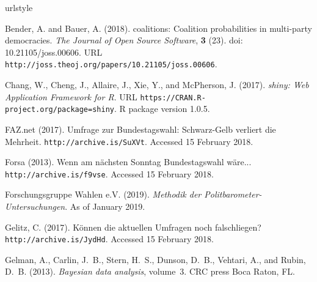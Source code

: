 \documentclass[smallextended]{svjour3}      %
\begin{document}

\begin{thebibliography}{13}
\providecommand{\natexlab}[1]{#1}
\providecommand{\url}[1]{\texttt{#1}}
\expandafter\ifx\csname urlstyle\endcsname\relax
  \providecommand{\doi}[1]{doi: #1}\else
  \providecommand{\doi}{doi: \begingroup \urlstyle{rm}\Url}\fi

{\rm Bender, A. {\rm and} Bauer, A.} (2018).
\newblock coalitions: Coalition probabilities in multi-party democracies.
\newblock \emph{The Journal of Open Source Software}, {\bf 3} (23).
\newblock \doi{10.21105/joss.00606}.
\newblock URL \url{http://joss.theoj.org/papers/10.21105/joss.00606}.

{\rm Chang, W., Cheng, J., Allaire, J., Xie, Y., {\rm and} McPherson, J.}
  (2017).
\newblock \emph{shiny: Web Application Framework for R}.
\newblock URL \url{https://CRAN.R-project.org/package=shiny}.
\newblock R package version 1.0.5.

{\rm FAZ.net} (2017).
\newblock Umfrage zur {B}undestagswahl: {S}chwarz-{G}elb verliert die
  {M}ehrheit.
\newblock \url{http://archive.is/SuXVt}.
\newblock Accessed 15 February 2018.

{\rm Forsa} (2013).
\newblock Wenn am n\"{a}chsten {S}onntag {B}undestagswahl w\"{a}re...
\newblock \url{http://archive.is/f9vse}.
\newblock Accessed 15 February 2018.

{\rm {Forschungsgruppe Wahlen e.V.}} (2019).
\newblock \emph{Methodik der {P}olitbarometer-{U}ntersuchungen}.
\newblock As of January 2019.

{\rm Gelitz, C.} (2017).
\newblock K\"{o}nnen die aktuellen {U}mfragen noch falsch\-liegen?
\newblock \url{http://archive.is/JydHd}.
\newblock Accessed 15 February 2018.

{\rm Gelman, A., Carlin, J.~B., Stern, H.~S., Dunson, D.~B., Vehtari, A., {\rm
  and} Rubin, D.~B.} (2013).
\newblock \emph{Bayesian data analysis}, volume~3.
\newblock CRC press Boca Raton, FL.


\end{thebibliography}
\end{document}
